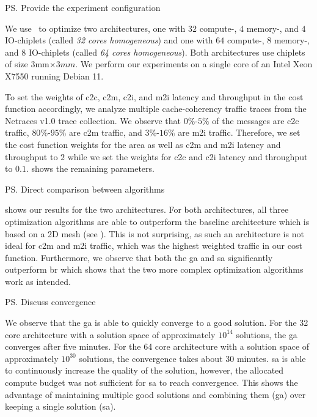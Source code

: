 \ps{Provide the experiment configuration}

We use \name~to optimize two architectures, one with $32$ compute-, $4$ memory-, and $4$ IO-chiplets (called \textit{32 cores homogeneous}) and one with $64$ compute-, $8$ memory-, and $8$ IO-chiplets (called \textit{64 cores homogeneous}).
Both architectures use chiplets of size $3$mm$ \times $3$mm$.
We perform our experiments on a single core of an Intel Xeon X7550 running Debian 11.

To set the weights of \gls{c2c}, \gls{c2m}, \gls{c2i}, and \gls{m2i} latency and throughput in the cost function accordingly, we analyze multiple cache-coherency traffic traces from the Netraces v1.0 \cite{netrace-traces} trace collection.
We observe that $0\%$-$5\%$ of the messages are \gls{c2c} traffic, $80\%$-$95\%$ are \gls{c2m} traffic, and $3\%$-$16\%$ are \gls{m2i} traffic.
Therefore, we set the cost function weights for the area as well as \gls{c2m} and \gls{m2i} latency and throughput to $2$ while we set the weights for \gls{c2c} and \gls{c2i} latency and throughput to $0.1$.
 shows the remaining parameters. 



\ps{Direct comparison between algorithms}

 shows our results for the two architectures.
For both architectures, all three optimization algorithms are able to outperform the baseline architecture which is based on a 2D mesh (see ).
This is not surprising, as such an architecture is not ideal for \gls{c2m} and \gls{m2i} traffic, which was the highest weighted traffic in our cost function.
Furthermore, we observe that both the \gls{ga} and \gls{sa} significantly outperform \gls{br} which shows that the two more complex optimization algorithms work as intended. 



\ps{Discuss convergence}

We observe that the \gls{ga} is able to quickly converge to a good solution. 
For the 32 core architecture with a solution space of approximately $10^{14}$ solutions, the \gls{ga} converges after five minutes.
For the 64 core architecture with a solution space of approximately $10^{30}$ solutions, the convergence takes about 30 minutes.
\gls{sa} is able to continuously increase the quality of the solution, however, the allocated compute budget was not sufficient for \gls{sa} to reach convergence.
This shows the advantage of maintaining multiple good solutions and combining them (\gls{ga}) over keeping a single solution (\gls{sa}).
